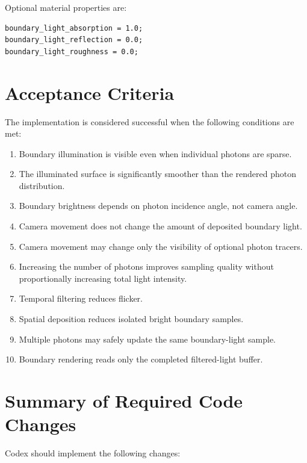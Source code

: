 \documentclass[11pt]{article}
\begin{document}
Optional material properties are:

\begin{lstlisting}
boundary_light_absorption = 1.0;
boundary_light_reflection = 0.0;
boundary_light_roughness = 0.0;
\end{lstlisting}

\section{Acceptance Criteria}

The implementation is considered successful when the following conditions are
met:

\begin{enumerate}
    \item Boundary illumination is visible even when individual photons are
    sparse.
    \item The illuminated surface is significantly smoother than the rendered
    photon distribution.
    \item Boundary brightness depends on photon incidence angle, not camera
    angle.
    \item Camera movement does not change the amount of deposited boundary
    light.
    \item Camera movement may change only the visibility of optional photon
    tracers.
    \item Increasing the number of photons improves sampling quality without
    proportionally increasing total light intensity.
    \item Temporal filtering reduces flicker.
    \item Spatial deposition reduces isolated bright boundary samples.
    \item Multiple photons may safely update the same boundary-light sample.
    \item Boundary rendering reads only the completed filtered-light buffer.
\end{enumerate}

\section{Summary of Required Code Changes}

Codex should implement the following changes:
\end{document}
